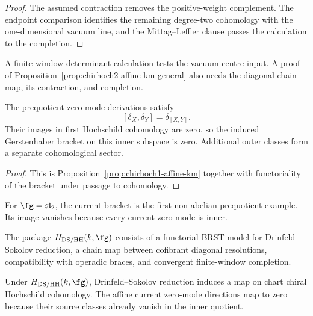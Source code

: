 \begin{proof}
The assumed contraction removes the positive-weight complement.  The
endpoint comparison identifies the remaining degree-two cohomology
with the one-dimensional vacuum line, and the Mittag--Leffler clause
passes the calculation to the completion.
\end{proof}

\begin{remark}
\label{rem:chirhoch2-affine-km-general-falsification}
A finite-window determinant calculation tests the vacuum-centre input.
A proof of Proposition~\ref{prop:chirhoch2-affine-km-general} also
needs the diagonal chain map, its contraction, and completion.
\end{remark}

\begin{proposition}
\label{prop:gerstenhaber-sl2-bracket}
The prequotient zero-mode derivations satisfy
\[
 [\delta_X,\delta_Y]=\delta_{[X,Y]}.
\]
Their images in first Hochschild cohomology are zero, so the induced
Gerstenhaber bracket on this inner subspace is zero.  Additional outer
classes form a separate cohomological sector.
\end{proposition}

\begin{proof}
This is Proposition~\ref{prop:chirhoch1-affine-km} together with
functoriality of the bracket under passage to cohomology.
\end{proof}

\begin{remark}
\label{rem:first-nonabelian-gerstenhaber}
For \(\fg=\mathfrak{sl}_2\), the current bracket is the first
non-abelian prequotient example.  Its image vanishes because every
current zero mode is inner.
\end{remark}

\begin{definition}
\label{def:cct-ds-hochschild-package}
The package \(H_{\mathrm{DS/HH}}(k,\fg)\) consists of a functorial
BRST model for Drinfeld--Sokolov reduction, a chain map between
cofibrant diagonal resolutions, compatibility with operadic braces,
and convergent finite-window completion.
\end{definition}

\begin{proposition}
\label{prop:ds-chirhoch-compatibility}
Under \(H_{\mathrm{DS/HH}}(k,\fg)\), Drinfeld--Sokolov reduction
induces a map on chart chiral Hochschild cohomology.  The affine
current zero-mode directions map to zero because their source classes
already vanish in the inner quotient.
\end{proposition}

